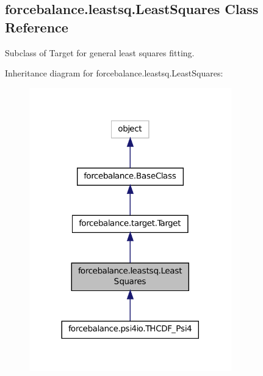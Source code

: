 \hypertarget{classforcebalance_1_1leastsq_1_1LeastSquares}{\subsection{forcebalance.\-leastsq.\-Least\-Squares Class Reference}
\label{classforcebalance_1_1leastsq_1_1LeastSquares}
}


Subclass of Target for general least squares fitting.  




Inheritance diagram for forcebalance.\-leastsq.\-Least\-Squares\-:
\nopagebreak
\begin{figure}[H]
\begin{center}
\leavevmode
\includegraphics[width=248pt]{classforcebalance_1_1leastsq_1_1LeastSquares__inherit__graph}
\end{center}
\end{figure}


